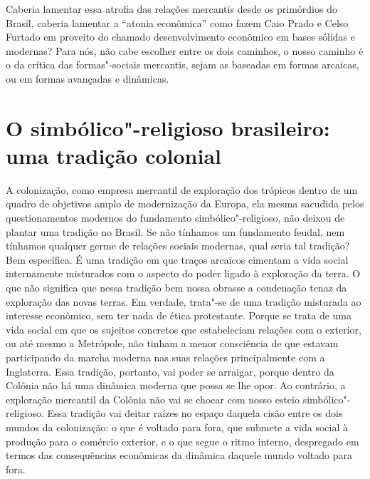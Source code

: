 Caberia lamentar essa atrofia das relações mercantis desde os primórdios
do Brasil, caberia lamentar a ``atonia econômica'' como fazem Caio Prado
e Celso Furtado em proveito do chamado desenvolvimento econômico em
bases sólidas e modernas? Para nós, não cabe escolher entre os dois
caminhos, o nosso caminho é o da crítica das formas"-sociais mercantis,
sejam as baseadas em formas arcaicas, ou em formas avançadas e
dinâmicas.

\section{O simbólico"-religioso brasileiro: uma tradição colonial}

A colonização, como empresa mercantil de exploração dos trópicos dentro
de um quadro de objetivos amplo de modernização da Europa, ela mesma
sacudida pelos questionamentos modernos do fundamento
simbólico"-religioso, não deixou de plantar uma tradição no Brasil. Se
não tínhamos um fundamento feudal, nem tínhamos qualquer germe de
relações sociais modernas, qual seria tal tradição? Bem específica. É
uma tradição em que traços arcaicos cimentam a vida social internamente
misturados com o aspecto do poder ligado à exploração da terra. O que
não significa que nessa tradição bem nossa obrasse a condenação tenaz da
exploração das novas terras. Em verdade, trata"-se de uma tradição
misturada ao interesse econômico, sem ter nada de ética protestante.
Porque se trata de uma vida social em que os sujeitos concretos que
estabeleciam relações com o exterior, ou até mesmo a Metrópole, não
tinham a menor consciência de que estavam participando da marcha moderna
nas suas relações principalmente com a Inglaterra. Essa tradição,
portanto, vai poder se arraigar, porque dentro da Colônia não há uma
dinâmica moderna que possa se lhe opor. Ao contrário, a exploração
mercantil da Colônia não vai se chocar com nosso esteio
simbólico"-religioso. Essa tradição vai deitar raízes no espaço daquela
cisão entre os dois mundos da colonização: o que é voltado para fora,
que submete a vida social à produção para o comércio exterior, e o que
segue o ritmo interno, despregado em termos das consequências econômicas
da dinâmica daquele mundo voltado para fora.

